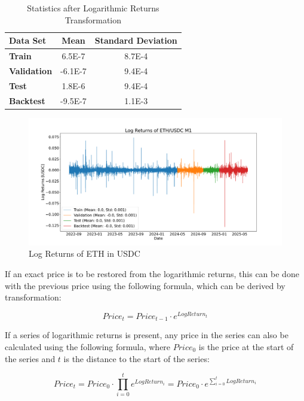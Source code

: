 \begin{table}[H]
    \centering
    \begin{tabular}{L{3cm}cc}
        \toprule
        \textbf{Data Set}   & Mean    & Standard Deviation \\
        \midrule
        \textbf{Train}      & 6.5E-7  & 8.7E-4             \\
        \textbf{Validation} & -6.1E-7 & 9.4E-4             \\
        \textbf{Test}       & 1.8E-6  & 9.4E-4             \\
        \textbf{Backtest}   & -9.5E-7 & 1.1E-3             \\
        \bottomrule
    \end{tabular}
    \caption{Statistics after Logarithmic Returns Transformation}
    \label{tbl:stat-log-returns}
\end{table}

\begin{figure}[H]
    \centering
    \includegraphics[width=\textwidth]{images/eda/log_returns_ethusdc}
    \caption{Log Returns of ETH in USDC}
    \label{fig:eth-log-data}
\end{figure}

\noindent
If an exact price is to be restored from the logarithmic returns, this can be done with the previous price using the following formula, which can be derived by transformation:

\[
    Price_t = Price_{t-1} \cdot e^{LogReturn_t}
\]

\noindent
If a series of logarithmic returns is present, any price in the series can also be calculated using the following formula, where $Price_{0}$ is the price at the start of the series and $t$ is the distance to the start of the series:

\[
    Price_t = Price_0 \cdot \prod_{i=0}^{t} e^{LogReturn_{i}} = Price_0 \cdot e^{\sum_{i=0}^{t} LogReturn_i}
\]

